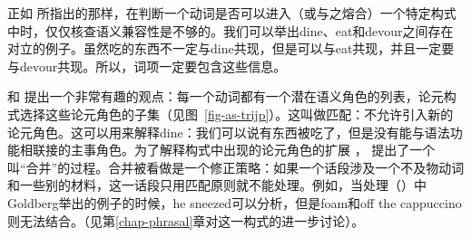 正如 \citet[--90]{Dowty89b-u}所指出的那样，在判断一个动词是否可以进入（或与之熔合）一个特定构式中时，仅仅核查语义兼容性是不够的。我们可以举出dine、eat和devour之间存在对立的例子。虽然吃的东西不一定与dine共现，但是可以与eat共现，并且一定要与devour共现。所以，词项一定要包含这些信息。

和 \citet{SvT2011a} 提出一个非常有趣的观点：每一个动词都有一个潜在语义角色的列表，论元构式选择这些论元角色的子集（见图~\ref{fig-as-trijp}）。这叫做匹配：不允许引入新的论元角色。这可以用来解释dine：我们可以说有东西被吃了，但是没有能与语法功能相联接的主事角色。为了解释构式中出现的论元角色的扩展 \citep[\S~7]{Goldberg95a}， \citet{SvT2011a} 提出了一个叫“合并”的过程。合并被看做是一个修正策略：如果一个话段涉及一个不及物动词和一些别的材料，这一话段只用匹配原则就不能处理。例如，当处理（）中Goldberg举出的例子的时候，he sneezed可以分析，但是foam和off the cappuccino则无法结合。（见第\ref{chap-phrasal}章对这一构式的进一步讨论）。

